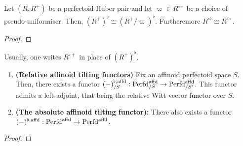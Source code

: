                \begin{lemma} \label{lemma: tilts_of_perfectoid_huber_pairs}
                    Let $(R, R^+)$ be a perfectoid Huber pair and let $\varpi \in R^{\circ \circ}$ be a choice of pseudo-uniformiser. Then, $(R^+)^{\flat} \cong (R^+/\varpi)^{\flat}$. Furtheremore $R^{\circ \flat} \cong R^{\flat \circ}$.
                \end{lemma}
                    \begin{proof}
                        
                    \end{proof}
                \begin{convention}
                    Usually, one writes $R^{\flat +}$ in place of $(R^+)^{\flat}$.
                \end{convention}
                \begin{proposition} \label{prop: tilting_functoriality}
                    \noindent
                    \begin{enumerate}
                        \item \textbf{(Relative affinoid tilting functors)} Fix an affinoid perfectoid space $S$. Then, there exists a functor $(-)^{\flat, \mathrm{affd}}_{/S}: \mathrm{Perfd}_{/S}^{\mathrm{affd}} \to \mathrm{Perfd}_{/S^{\flat}}^{\mathrm{affd}}$. This functor admits a left-adjoint, that being the relative Witt vector functor over $S$. 
                        \item \textbf{(The absolute affinoid tilting functor):} There also exists a functor $(-)^{\flat, \mathrm{affd}}: \mathrm{Perfd}^{\mathrm{affd}} \to \mathrm{Perfd}^{\mathrm{affd}}$.
                    \end{enumerate}
                \end{proposition}
                    \begin{proof}
                        
                    \end{proof}
                    
